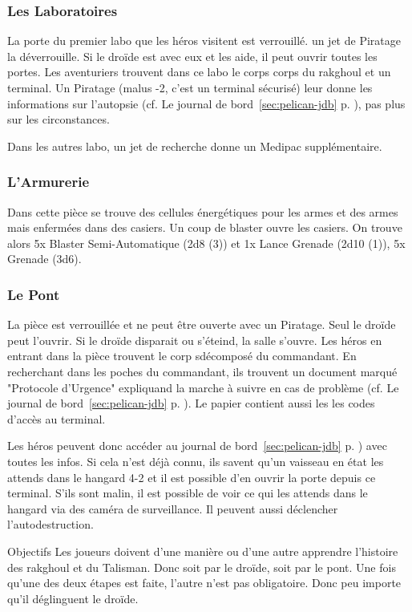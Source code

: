 \subsubsection{Les Laboratoires}
La porte du premier labo que les héros visitent est verrouillé. un jet de Piratage la déverrouille. Si le droïde est avec eux et les aide, il peut ouvrir toutes les portes. Les aventuriers trouvent dans ce labo le corps corps du rakghoul et un terminal. Un Piratage (malus -2, c'est un terminal sécurisé) leur donne les informations sur l'autopsie (cf. Le journal de bord~\ref{sec:pelican-jdb} p. \pageref{sec:pelican-jdb}), pas plus sur les circonstances.

Dans les autres labo, un jet de recherche donne un Medipac supplémentaire.

\subsubsection{L'Armurerie}
Dans cette pièce se trouve des cellules énergétiques pour les armes et des armes mais enfermées dans des casiers. Un coup de blaster ouvre les casiers. On trouve alors 5x Blaster Semi-Automatique (2d8 (3)) et 1x Lance Grenade (2d10 (1)), 5x Grenade (3d6).


\subsubsection{Le Pont}
La pièce est verrouillée et ne peut être ouverte avec un Piratage. Seul le droïde peut l'ouvrir. Si le droïde disparait ou s'éteind, la salle s'ouvre. Les héros en entrant dans la pièce trouvent le corp sdécomposé du commandant. En recherchant dans les poches du commandant, ils trouvent un document marqué "Protocole d'Urgence" expliquand la marche à suivre en cas de problème (cf. Le journal de bord~\ref{sec:pelican-jdb} p. \pageref{sec:pelican-jdb}). Le papier contient aussi les les codes d'accès au terminal.

Les héros peuvent donc accéder au journal de bord~\ref{sec:pelican-jdb} p. \pageref{sec:pelican-jdb}) avec toutes les infos. Si cela n'est déjà connu, ils savent qu'un vaisseau en état les attends dans le hangard 4-2 et il est possible d'en ouvrir la porte depuis ce terminal. S'ils sont malin, il est possible de voir ce qui les attends dans le hangard via des caméra de surveillance. Il peuvent aussi déclencher l'autodestruction.

\begin{paperbox}{Objectifs}
Les joueurs doivent d'une manière ou d'une autre apprendre l'histoire des rakghoul et du Talisman. Donc soit par le droïde, soit par le pont. Une fois qu'une des deux étapes est faite, l'autre n'est pas obligatoire. Donc peu importe qu'il déglinguent le droïde.
\end{paperbox}

